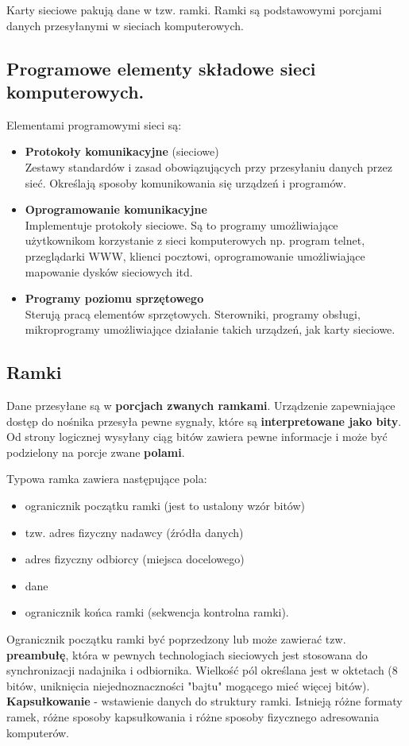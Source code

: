\documentclass[a4paper]{article}
\begin{document}
Karty	sieciowe	pakują	dane	w	tzw.	ramki. Ramki	są	podstawowymi	porcjami	danych	przesyłanymi	w	sieciach	komputerowych.


\subsection{Programowe	elementy	składowe	sieci	komputerowych.}
Elementami	programowymi	sieci	są:
\begin{itemize}
    \item \textbf{Protokoły	 komunikacyjne} (sieciowe)\\
    Zestawy standardów i zasad obowiązujących przy	 przesyłaniu danych	przez	sieć. Określają sposoby komunikowania się urządzeń	i	programów.
    \item \textbf{Oprogramowanie	komunikacyjne}\\
    Implementuje protokoły sieciowe. Są to programy	 umożliwiające	 użytkownikom	 korzystanie	 z
    sieci	 komputerowych	 np. program telnet, przeglądarki WWW, klienci pocztowi, oprogramowanie	umożliwiające mapowanie	dysków	sieciowych	itd.
    \item \textbf{Programy	 poziomu	 sprzętowego}\\
    Sterują pracą elementów	 sprzętowych. Sterowniki, programy	 obsługi, mikroprogramy umożliwiające	działanie	takich	urządzeń,	jak	karty	sieciowe.
\end{itemize}

\subsection{Ramki}
Dane przesyłane są w \textbf{porcjach zwanych ramkami}. Urządzenie	zapewniające dostęp	do nośnika przesyła	pewne sygnały, które są \textbf{interpretowane jako bity}. Od strony	logicznej wysyłany	ciąg bitów zawiera	pewne informacje i może	być	podzielony na porcje zwane \textbf{polami}.

Typowa ramka zawiera następujące pola:
\begin{itemize}
    \item ogranicznik początku ramki (jest	to	ustalony	wzór	bitów)
    \item tzw.	adres fizyczny nadawcy (źródła	danych)
    \item adres	fizyczny odbiorcy (miejsca	docelowego)
    \item dane
    \item ogranicznik końca	ramki (sekwencja	kontrolna	ramki).
\end{itemize}
Ogranicznik	 początku ramki być poprzedzony lub może zawierać tzw. \textbf{preambułę}, która w pewnych technologiach sieciowych jest stosowana do synchronizacji nadajnika i
odbiornika. Wielkość pól określana jest w oktetach (8 bitów, uniknięcia niejednoznaczności "bajtu" mogącego mieć więcej bitów). \textbf{Kapsułkowanie} - wstawienie danych do struktury ramki. Istnieją różne formaty ramek, różne sposoby kapsułkowania i różne sposoby fizycznego adresowania komputerów.
\end{document}
